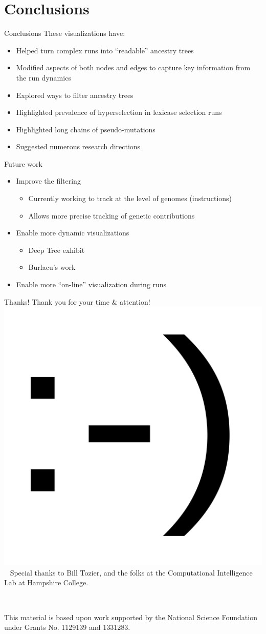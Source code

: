\documentclass{beamer}
\begin{document}
\section{Conclusions}
\begin{frame}{Conclusions}
These visualizations have:
\begin{itemize}
\item Helped turn complex runs into ``readable'' ancestry trees
\item Modified aspects of both nodes and edges to capture key information from the run dynamics
\item Explored ways to filter ancestry trees
\item Highlighted prevalence of hyperselection in lexicase selection runs
\item Highlighted long chains of pseudo-mutations
\item Suggested numerous research directions
\end{itemize}
\end{frame}

\begin{frame}{Future work}
\begin{itemize}
	\item Improve the filtering
    \begin{itemize}
    	\item Currently working to track at the level of genomes (instructions)
        \item Allows more precise tracking of genetic contributions
    \end{itemize}
	\item Enable more dynamic visualizations 
    \begin{itemize}
    	\item Deep Tree exhibit~\cite{DeepTree}
        \item Burlacu's work
    \end{itemize}
    \item Enable more ``on-line'' visualization during runs
\end{itemize}
\end{frame}

\begin{frame}{Thanks!}
\center \Large
Thank you for your time \& attention! \\ \medskip
\includegraphics[width=.1\textwidth]{Illustrations/smile.png} \\ \medskip
\normalsize
~
Special thanks to Bill Tozier, and the folks at the Computational Intelligence Lab at Hampshire College.

~

This material is based upon work supported by the National Science Foundation under 
Grants No. 1129139 and 1331283.

\end{frame}
\end{document}
